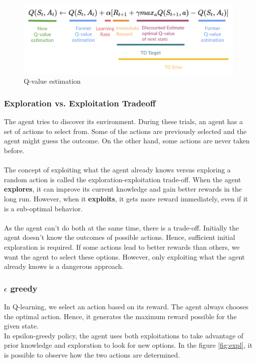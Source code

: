 \documentclass{article}
\begin{document}
\begin{figure}[h]
	\centering
	\includegraphics[width=0.5\linewidth]{../data/images/Q-learning-8.png}
	\caption{Q-value estimation}
	\label{fig:q_learning}
\end{figure}

\subsubsection{Exploration vs. Exploitation Tradeoff}
The agent tries to discover its environment. During these trials, an agent has a set of actions to select from. Some of the actions are previously selected and the agent might guess the outcome. On the other hand, some actions are never taken before.\\ \\
The concept of exploiting what the agent already knows versus exploring a random action is called the exploration-exploitation trade-off.
When the agent \textbf{explores}, it can improve its current knowledge and gain better rewards in the long run. However, when it \textbf{exploits}, it gets more reward immediately, even if it is a sub-optimal behavior.  \\ \\
As the agent can’t do both at the same time, there is a trade-off. Initially the agent doesn’t know the outcomes of possible actions. Hence, sufficient initial exploration is required. If some actions lead to better rewards than others, we want the agent to select these options. However, only exploiting what the agent already knows is a dangerous approach.

\subsubsection{$\epsilon$ greedy}
In Q-learning, we select an action based on its reward. The agent always chooses the optimal action. Hence, it generates the maximum reward possible for the given state.\\
In epsilon-greedy policy, the agent uses both exploitations to take advantage of prior knowledge and exploration to look for new options. In the figure \ref{fig:expl}, it is possible to observe how the two actions are determined.
\end{document}
